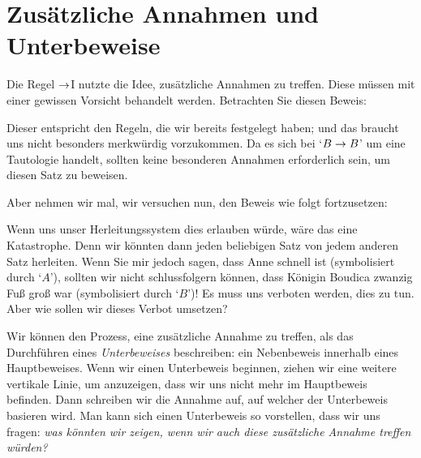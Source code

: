 \section{Zusätzliche Annahmen und Unterbeweise}
Die Regel $\rightarrow$I nutzte die Idee, zusätzliche Annahmen zu treffen. Diese müssen mit einer gewissen Vorsicht behandelt werden. Betrachten Sie diesen Beweis:
\begin{fitchproof}
	\open
		 
	\close
\end{fitchproof}
Dieser entspricht den Regeln, die wir bereits festgelegt haben; und das braucht uns nicht besonders merkwürdig vorzukommen. Da es sich bei `$B \rightarrow B$' um eine Tautologie handelt, sollten keine besonderen Annahmen erforderlich sein, um diesen Satz zu beweisen. 

Aber nehmen wir mal, wir versuchen nun, den Beweis wie folgt fortzusetzen:
\begin{fitchproof}
	\open
		 
	\close
	 
	 
\end{fitchproof}
Wenn uns unser Herleitungssystem dies erlauben würde, wäre das eine Katastrophe. Denn wir könnten dann jeden beliebigen Satz von jedem anderen Satz herleiten. Wenn Sie mir jedoch sagen, dass Anne schnell ist (symbolisiert durch `$A$'), sollten wir nicht schlussfolgern können, dass Königin Boudica zwanzig Fu{\ss} gro{\ss} war (symbolisiert durch `$B$')! Es muss uns verboten werden, dies zu tun. Aber wie sollen wir dieses Verbot umsetzen?

Wir können den Prozess, eine zusätzliche Annahme zu treffen, als das Durchführen eines \emph{Unterbeweises} beschreiben: ein Nebenbeweis innerhalb eines Hauptbeweises. Wenn wir einen Unterbeweis beginnen, ziehen wir eine weitere vertikale Linie, um anzuzeigen, dass wir uns nicht mehr im Hauptbeweis befinden. Dann schreiben wir die Annahme auf, auf welcher der Unterbeweis basieren wird. Man kann sich einen Unterbeweis so vorstellen, dass wir uns fragen: \emph{was könnten wir zeigen, wenn wir auch diese zusätzliche Annahme treffen würden?}

